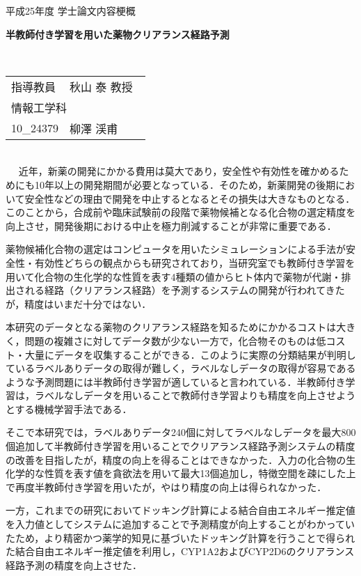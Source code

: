 {
 \thispagestyle{empty}
 \large
 \noindent
 平成25年度 学士論文内容梗概
　\\
 \begin{center}
  \textbf{\LARGE 半教師付き学習を用いた薬物クリアランス経路予測}
 \end{center}
　\\
 \hfill 
 \begin{tabular}{llll}
 指導教員& \multicolumn{3}{l}{秋山 泰 教授} \\
  \multicolumn{4}{l}{情報工学科} \\
 10\_24379\hspace{.5cm} & {柳澤 渓甫}
 \end{tabular}

\mbox{}\\
\small　
近年，新薬の開発にかかる費用は莫大であり，安全性や有効性を確かめるためにも10年以上の開発期間が必要となっている．そのため，新薬開発の後期において安全性などの理由で開発を中止するとなるとその損失は大きなものとなる．
このことから，合成前や臨床試験前の段階で薬物候補となる化合物の選定精度を向上させ，開発後期における中止を極力削減することが非常に重要である．

薬物候補化合物の選定はコンピュータを用いたシミュレーションによる手法が安全性・有効性どちらの観点からも研究されており，当研究室でも教師付き学習を用いて化合物の生化学的な性質を表す4種類の値からヒト体内で薬物が代謝・排出される経路（クリアランス経路）を予測するシステムの開発が行われてきたが，精度はいまだ十分ではない．


本研究のデータとなる薬物のクリアランス経路を知るためにかかるコストは大きく，問題の複雑さに対してデータ数が少ない一方で，化合物そのものは低コスト・大量にデータを収集することができる．このように実際の分類結果が判明しているラベルありデータの取得が難しく，ラベルなしデータの取得が容易であるような予測問題には半教師付き学習が適していると言われている．半教師付き学習は，ラベルなしデータを用いることで教師付き学習よりも精度を向上させようとする機械学習手法である．

そこで本研究では，ラベルありデータ240個に対してラベルなしデータを最大800個追加して半教師付き学習を用いることでクリアランス経路予測システムの精度の改善を目指したが，精度の向上を得ることはできなかった．入力の化合物の生化学的な性質を表す値を貪欲法を用いて最大13個追加し，特徴空間を疎にした上で再度半教師付き学習を用いたが，やはり精度の向上は得られなかった．

一方，これまでの研究においてドッキング計算による結合自由エネルギー推定値を入力値としてシステムに追加することで予測精度が向上することがわかっていたため，より精密かつ薬学的知見に基づいたドッキング計算を行うことで得られた結合自由エネルギー推定値を利用し，CYP1A2およびCYP2D6のクリアランス経路予測の精度を向上させた．

\thispagestyle{empty}
\addtocounter{page}{-1}
}
